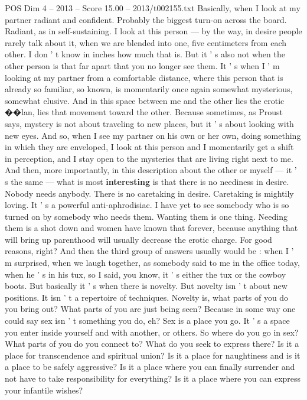 \begin{textsample}{POS Dim 4 – 2013 – Score 15.00 – 2013/t002155.txt}
Basically, when I look at my partner radiant and confident.
Probably the biggest turn-on across the board.
Radiant, as in self-sustaining.
I look at this person — by the way, in desire people rarely talk about it, when we are blended into one, five centimeters from each other.
I don ' t know in inches how much that is.
But it ' s also not when the other person is that far apart that you no longer see them.
It ' s when I ' m looking at my partner from a comfortable distance, where this person that is already so familiar, so known, is momentarily once again somewhat mysterious, somewhat elusive.
And in this space between me and the other lies the erotic {\EmojiFont �}{\EmojiFont �}lan, lies that movement toward the other.
Because sometimes, as Proust says, mystery is not about traveling to new places, but it ' s about looking with new eyes.
And so, when I see my partner on his own or her own, doing something in which they are enveloped, I look at this person and I momentarily get a shift in perception, and I stay open to the mysteries that are living right next to me.
And then, more importantly, in this description about the other or myself — it ' s the same — what is most \textbf{interesting} is that there is no neediness in desire.
Nobody needs anybody.
There is no caretaking in desire.
Caretaking is mightily loving.
It ' s a powerful anti-aphrodisiac.
I have yet to see somebody who is so turned on by somebody who needs them.
Wanting them is one thing.
Needing them is a shot down and women have known that forever, because anything that will bring up parenthood will usually decrease the erotic charge.
For good reasons, right?
And then the third group of answers usually would be : when I ' m surprised, when we laugh together, as somebody said to me in the office today, when he ' s in his tux, so I said, you know, it ' s either the tux or the cowboy boots.
But basically it ' s when there is novelty.
But novelty isn ' t about new positions.
It isn ' t a repertoire of techniques.
Novelty is, what parts of you do you bring out?
What parts of you are just being seen?
Because in some way one could say sex isn ' t something you do, eh?
Sex is a place you go.
It ' s a space you enter inside yourself and with another, or others.
So where do you go in sex?
What parts of you do you connect to?
What do you seek to express there?
Is it a place for transcendence and spiritual union?
Is it a place for naughtiness and is it a place to be safely aggressive?
Is it a place where you can finally surrender and not have to take responsibility for everything?
Is it a place where you can express your infantile wishes?

\end{textsample}
